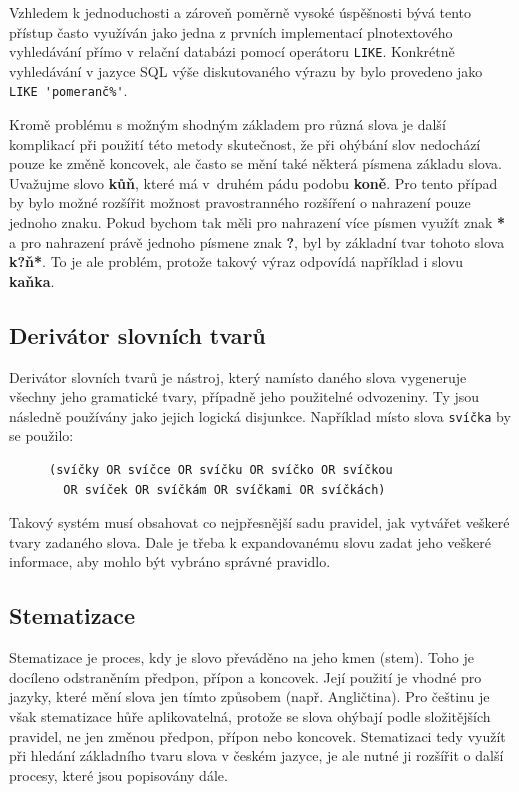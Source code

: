 \documentclass[FM,DP]{tulthesis}
\begin{document}
Vzhledem k jednoduchosti a zároveň poměrně vysoké úspěšnosti bývá tento přístup
často využíván jako jedna z prvních implementací plnotextového vyhledávání přímo
v relační databázi pomocí operátoru \verb|LIKE|. Konkrétně vyhledávání v jazyce SQL
výše diskutovaného výrazu by bylo provedeno jako \verb|LIKE 'pomeranč%'|.

Kromě problému s možným shodným základem pro různá slova je další komplikací při 
použití této metody skutečnost, že při ohýbání slov nedochází pouze ke změně koncovek, 
ale často se mění také některá písmena základu slova. Uvažujme slovo \textbf{kůň}, které
má v~druhém pádu podobu \textbf{koně}. Pro tento případ by bylo možné rozšířit možnost 
pravostranného rozšíření o nahrazení pouze jednoho znaku. Pokud bychom tak měli 
pro nahrazení více písmen využít znak \textbf{*} a pro nahrazení právě jednoho písmene 
znak \textbf{?}, byl by základní tvar tohoto slova \textbf{k?ň*}. To je ale problém, protože 
takový výraz odpovídá například i slovu \textbf{kaňka}.

\subsection{Derivátor slovních tvarů}

Derivátor slovních tvarů je nástroj, který namísto daného slova vygeneruje 
všechny jeho gramatické tvary, případně jeho použitelné odvozeniny. 
Ty jsou následně používány jako jejich logická disjunkce. Například místo 
slova \verb|svíčka| by se použilo:

\begin{figure}[thp]
\centering 
\begin{minipage}{0.7\textwidth}
\begin{verbatim}
(svíčky OR svíčce OR svíčku OR svíčko OR svíčkou 
  OR svíček OR svíčkám OR svíčkami OR svíčkách)
\end{verbatim}
\end{minipage}
\end{figure}

Takový systém musí obsahovat co nejpřesnější sadu pravidel, jak vytvářet
veškeré tvary zadaného slova. Dale je třeba k expandovanému slovu zadat
jeho veškeré informace, aby mohlo být vybráno správné pravidlo.

\subsection{Stematizace}

Stematizace je proces, kdy je slovo převáděno na jeho kmen (stem). Toho je docíleno
odstraněním předpon, přípon a koncovek. Její použití je vhodné pro jazyky, 
které mění slova jen tímto způsobem (např. Angličtina). Pro češtinu je však stematizace
hůře aplikovatelná, protože se slova ohýbají podle složitějších pravidel, ne jen
změnou předpon, přípon nebo koncovek. Stematizaci tedy využít při hledání základního
tvaru slova v českém jazyce, je ale nutné ji rozšířit o další procesy, které jsou 
popisovány dále.
\end{document}
